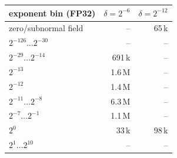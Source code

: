 \begin{tabular}{lrr}
\toprule
exponent bin (FP32) & $\delta=2^{-6}$ & $\delta=2^{-12}$\\
\midrule
zero/subnormal field & -- & 65\,k\\
$2^{-126}\ldots2^{-30}$ & -- & --\\
$2^{-29}\ldots2^{-14}$ & 691\,k & --\\
$2^{-13}$ & 1.6\,M & --\\
$2^{-12}$ & 1.4\,M & --\\
$2^{-11}\ldots2^{-8}$ & 6.3\,M & --\\
$2^{-7}\ldots2^{-1}$ & 1.1\,M & --\\
$2^{0}$ & 33\,k & 98\,k\\
$2^{1}\ldots2^{10}$ & -- & --\\
\bottomrule
\end{tabular}
